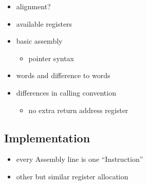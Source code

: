 \begin{itemize}
    \item alignment?
    \item available registers
    \item basic assembly
    \begin{itemize}
        \item pointer syntax
    \end{itemize}
    \item words and difference to \riscv{} words
	\item differences in calling convention
    \begin{itemize}
        \item no extra return address register
    \end{itemize}
\end{itemize}

\subsection{Implementation}

\begin{itemize}
	\item every Assembly line is one ``Instruction''
    \item other but similar register allocation
\end{itemize}

